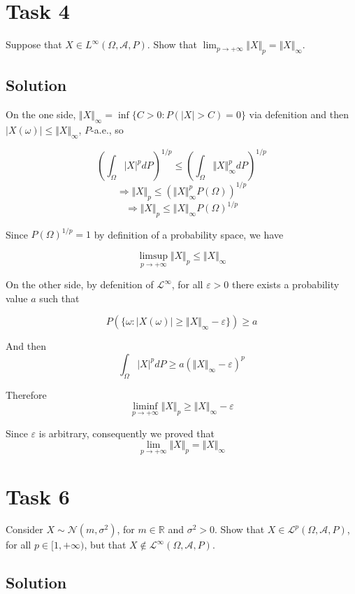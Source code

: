 \documentclass{article}
\begin{document}
\section*{Task 4}

Suppose that $X \in L^\infty(\Omega, \mathcal A, P)$. Show that $\lim_{p\to+\infty} \Vert X \Vert_p = \Vert X \Vert_\infty$.

\subsection*{Solution}

On the one side, $\Vert X \Vert_\infty = \inf\{C>0:P(\vert X \vert > C) = 0\}$ via defenition and then $|X(\omega)| \leq \Vert X \Vert_\infty$, $P$-a.e., so

$$ \left(\int_\Omega \vert X \vert ^p dP \right)^{1/p} \leq \left(\int_\Omega \Vert X \Vert^p_\infty dP \right)^{1/p}$$
$$\Rightarrow \Vert X \Vert_p \leq \left(\Vert X \Vert_\infty^p P(\Omega) \right)^{1/p}$$
$$\Rightarrow \Vert X \Vert_p \leq \Vert X \Vert_\infty  P(\Omega)^{1/p}$$

Since $P(\Omega)^{1/p} = 1$ by definition of a probability space, we have 

$$\limsup_{p\to+\infty} \Vert X \Vert_p \leq \Vert X \Vert_\infty$$ 

On the other side, by defenition of $\mathcal L^\infty$, for all $\varepsilon > 0$ there exists a probability value $a$ such that

$$P(\{\omega : |X (\omega)| \geq \Vert X \Vert_\infty - \varepsilon \}) \geq a$$

And then 
$$\int_\Omega |X|^p dP \geq a(\Vert X \Vert_\infty - \varepsilon)^p$$

Therefore
$$\liminf_{p\rightarrow+\infty}\Vert X \Vert_p \geq \Vert X \Vert_\infty - \varepsilon$$

Since $\varepsilon$ is arbitrary, consequently we proved that 
$$\lim_{p\to+\infty} \Vert X \Vert_p = \Vert X \Vert_\infty$$

\section*{Task 6}

Consider $X \sim \mathcal N(m, \sigma^2)$, for $m \in \mathbb R$ and $\sigma^2 > 0$. Show that $X \in \mathcal L^p (\Omega, \mathcal A, P)$, for all $p \in [1, +\infty)$, but that $X \notin \mathcal L^\infty(\Omega, \mathcal A, P)$.

\subsection*{Solution}
\end{document}

